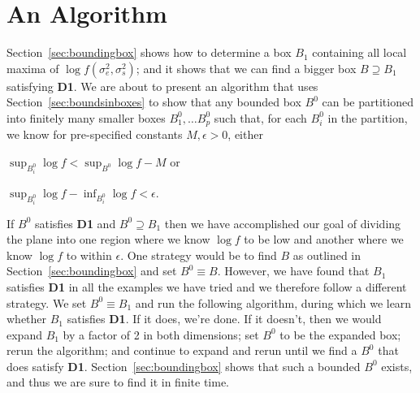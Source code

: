 \documentclass{report}
\newcommand{\RL}{f}
\newcommand{\logRL}{\log\RL}
\newcommand{\sigssq}{\sigma_s^2}
\newcommand{\sigesq}{\sigma_e^2}
\newcommand{\logRLss}{\logRL(\sigesq,\sigssq)}
\begin{document}
\section{An Algorithm}
\label{sec:algorithm}
Section~\ref{sec:boundingbox} shows how to determine a box $B_1$ containing all local maxima of $\logRLss$; and it shows that we can find a bigger box $B\supseteq B_1$ satisfying \textbf{D1}.  We are about to present an algorithm that uses Section~\ref{sec:boundsinboxes} to show that any bounded box $B^0$ can be partitioned into finitely many smaller boxes $B^0_1, \dots B^0_p$  such that, for each $B^0_i$ in the partition, we know for pre-specified constants $M, \epsilon >0$, either
\begin{enumerate*}[label=(\alph*)]
\item $\sup_{B^0_i} \logRL < \sup_{B^0} \logRL -M$ or
\item $\sup_{B^0_i} \logRL - \inf_{B^0_i} \logRL < \epsilon$.
\end{enumerate*}
If $B^0$ satisfies \textbf{D1} and $B^0\supseteq B_1$ then we have accomplished our goal of dividing the plane into one region where we know $\logRL$ to be low and another where we know $\logRL$ to within $\epsilon$.  One strategy would be to find $B$ as outlined in Section~\ref{sec:boundingbox} and set $B^0 \equiv B$.  However, we have found that $B_1$ satisfies \textbf{D1} in all the examples we have tried and we therefore follow a different strategy.  We set $B^0 \equiv B_1$ and run the following algorithm, during which we learn whether $B_1$ satisfies \textbf{D1}.  If it does, we're done.  If it doesn't, then we would expand $B_1$ by a factor of 2 in both dimensions; set $B^0$ to be the expanded box; rerun the algorithm; and continue to expand and rerun until we find a $B^0$ that does satisfy \textbf{D1}.  Section~\ref{sec:boundingbox} shows that such a bounded $B^0$ exists, and thus we are sure to find it in finite time.
\end{document}
